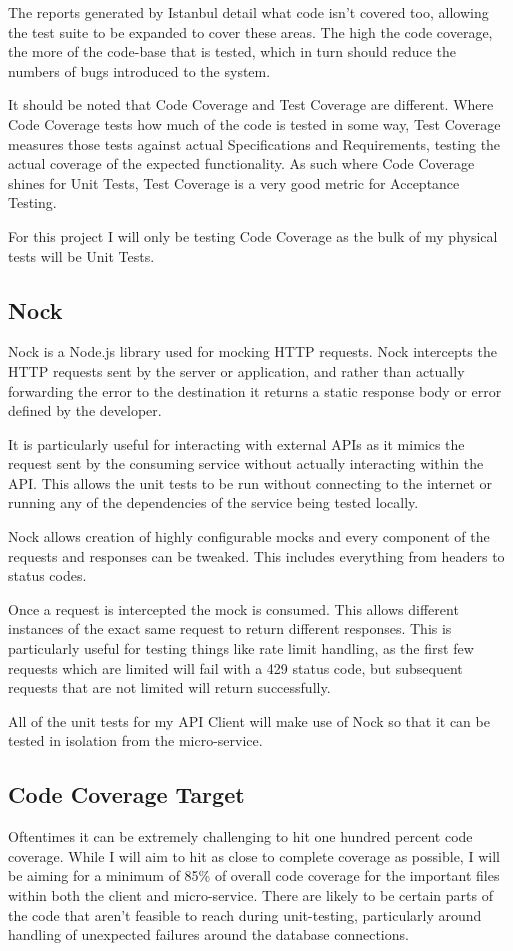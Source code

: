 The reports generated by Istanbul detail what code isn't covered too, allowing the test suite to be expanded to cover these areas. The high the code coverage, the more of the code-base that is tested, which in turn should reduce the numbers of bugs introduced to the system.

It should be noted that Code Coverage and Test Coverage are different. Where Code Coverage tests how much of the code is tested in some way, Test Coverage measures those tests against actual Specifications and Requirements, testing the actual coverage of the expected functionality. As such where Code Coverage shines for Unit Tests, Test Coverage is a very good metric for Acceptance Testing.

For this project I will only be testing Code Coverage as the bulk of my physical tests will be Unit Tests.
\subsection{Nock}
Nock is a Node.js library used for mocking HTTP requests. Nock intercepts the HTTP requests sent by the server or application, and rather than actually forwarding the error to the destination it returns a static response body or error defined by the developer. 

It is particularly useful for interacting with external APIs as it mimics the request sent by the consuming service without actually interacting within the API. This allows the unit tests to be run without connecting to the internet or running any of the dependencies of the service being tested locally. 

Nock allows creation of highly configurable mocks and every component of the requests and responses can be tweaked. This includes everything from headers to status codes.

Once a request is intercepted the mock is consumed. This allows different instances of the exact same request to return different responses. This is particularly useful for testing things like rate limit handling, as the first few requests which are limited will fail with a 429 status code, but subsequent requests that are not limited will return successfully.

All of the unit tests for my API Client will make use of Nock so that it can be tested in isolation from the micro-service.
\subsection{Code Coverage Target}
Oftentimes it can be extremely challenging to hit one hundred percent code coverage. While I will aim to hit as close to complete coverage as possible, I will be aiming for a minimum of 85\% of overall code coverage for the important files within both the client and micro-service. There are likely to be certain parts of the code that aren't feasible to reach during unit-testing, particularly around handling of unexpected failures around the database connections.

